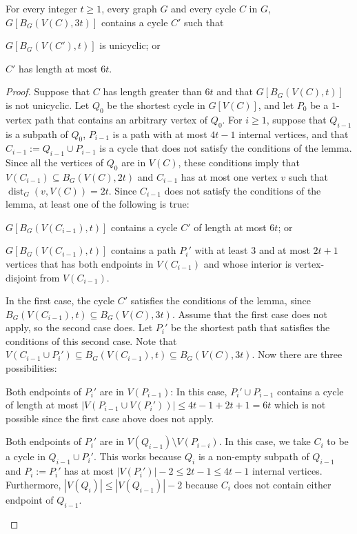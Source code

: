 \documentclass{patmorin}
\renewcommand{\ge}{\geqslant}
\renewcommand{\le}{\leqslant}
\DeclareMathOperator{\dist}{dist}
\begin{document}
\begin{lem}\label{short_or_unicycle_nearby}
  For every integer $t\ge 1$, every graph $G$ and every cycle $C$ in $G$,  $G[B_G(V(C),3t)]$ contains a cycle $C'$ such that
  \begin{compactenum}[(a)]
    \item $G[B_G(V(C'),t)]$ is unicyclic; or
    \item $C'$ has length at most $6t$.
  \end{compactenum}
\end{lem}

\begin{proof}
  Suppose that $C$ has length greater than $6t$ and that $G[B_G(V(C),t)]$ is not unicyclic.
  Let $Q_0$ be the shortest cycle in $G[V(C)]$, and let $P_0$ be a $1$-vertex path that contains an arbitrary vertex of $Q_0$.  For $i\ge 1$, suppose that $Q_{i-1}$ is a subpath of $Q_0$, $P_{i-1}$ is a path with at most $4t-1$ internal vertices, and that $C_{i-1}:=Q_{i-1}\cup P_{i-1}$ is a cycle that does not satisfy the conditions of the lemma.  Since all the vertices of $Q_0$ are in $V(C)$, these conditions imply that $V(C_{i-1})\subseteq B_G(V(C),2t)$ and $C_{i-1}$ has at most one vertex $v$ such that $\dist_G(v,V(C))=2t$.  Since $C_{i-1}$ does not satisfy the conditions of the lemma, at least one of the following is true:
  \begin{compactenum}
    \item $G[B_G(V(C_{i-1}),t)]$ contains a cycle $C'$ of length at most $6t$; or
    \item $G[B_G(V(C_{i-1}),t)]$ contains a path $P_i'$ with at least $3$ and at most $2t+1$ vertices that has both endpoints in $V(C_{i-1})$ and whose interior is vertex-disjoint from $V(C_{i-1})$.
  \end{compactenum}
  In the first case, the cycle $C'$ satisfies the conditions of the lemma, since $B_G(V(C_{i-1}),t)\subseteq B_G(V(C),3t)$.  Assume that the first case does not apply, so the second case does.  Let $P_i'$ be the shortest path that satisfies the conditions of this second case.  Note that $V(C_{i-1}\cup P_i')\subseteq B_G(V(C_{i-1}),t)\subseteq B_G(V(C),3t)$.   Now there are three possibilities:
  \begin{compactenum}
    \item Both endpoints of $P_i'$ are in $V(P_{i-1})$: In this case, $P_i'\cup P_{i-1}$ contains a cycle of length at most $|V(P_{i-1}\cup V(P_i'))|\le 4t-1+2t+1=6t$ which is not possible since the first case above does not apply.
    \item Both endpoints of $P_i'$ are in $V(Q_{i-1})\setminus V(P_{i-i})$.    In this case, we take $C_i$ to be a cycle in $Q_{i-1}\cup P_i'$. This works because $Q_i$ is a non-empty subpath of $Q_{i-1}$ and $P_i:=P_i'$ has at most $|V(P_i')|-2\le 2t-1\le 4t-1$ internal vertices.  Furthermore, $|V(Q_i)|\le |V(Q_{i-1})|-2$ because $C_i$ does not contain either endpoint of $Q_{i-1}$.

\end{compactenum}
\end{proof}
\end{document}
